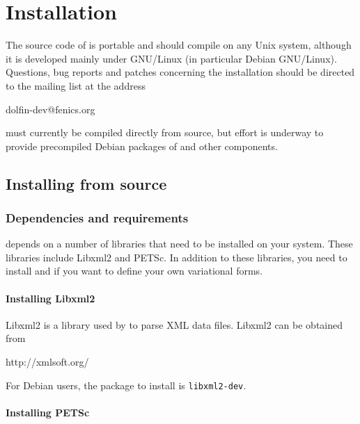 \chapter{Installation}

The source code of \dolfin{} is portable and should compile on any
Unix system, although it is developed mainly under GNU/Linux
(in particular Debian GNU/Linux). Questions, bug reports and patches
concerning the installation should be directed to the
\dolfin{} mailing list at the address
\begin{code}
  dolfin-dev@fenics.org
\end{code}

\dolfin{} must currently be compiled directly from source, but effort
is underway to provide precompiled Debian packages of \dolfin{} and
other \fenics{} components.

\section{Installing from source}

\subsection{Dependencies and requirements}

\dolfin{} depends on a number of libraries that need to be installed on your
system. These libraries include Libxml2 and PETSc. In addition to these libraries,
you need to install \fiat{} and \ffc{} if you want to define your own variational forms.

\subsubsection{Installing Libxml2}

Libxml2 is a library used by \dolfin{} to parse XML data files. Libxml2 can be obtained from
\begin{code}
  http://xmlsoft.org/
\end{code}
For Debian users, the package to install is \texttt{libxml2-dev}.

\subsubsection{Installing PETSc}

